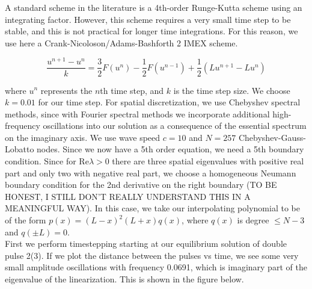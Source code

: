 \documentclass[12pt]{article}
\begin{document}
A standard scheme in the literature is a 4th-order Runge-Kutta scheme using an integrating factor. However, this scheme requires a very small time step to be stable, and this is not practical for longer time integrations. For this reason, we use here a  Crank-Nicoloson/Adams-Bashforth 2 IMEX scheme.

\begin{equation}\label{scheme}
\frac{u^{n+1} - u^n}{k} = \frac{3}{2}F(u^n) - \frac{1}{2}F(u^{n-1}) + \frac{1}{2}\left(Lu^{n+1} - Lu^n \right) 
\end{equation}

where $u^n$ represents the $n$th time step, and $k$ is the time step size. We choose $k = 0.01$ for our time step. For spatial discretization, we use Chebyshev spectral methods, since with Fourier spectral methods we incorporate additional high-frequency oscillations into our solution as a consequence of the essential spectrum on the imaginary axis. We use wave speed $c = 10$ and $N = 257$ Chebyshev-Gauss-Lobatto nodes. Since we now have a 5th order equation, we need a 5th boundary condition. Since for $\textrm{Re} \lambda > 0$ there are three spatial eigenvalues with positive real part and only two with negative real part, we choose a homogeneous Neumann boundary condition for the 2nd derivative on the right boundary (TO BE HONEST, I STILL DON'T REALLY UNDERSTAND THIS IN A MEANINGFUL WAY). In this case, we take our interpolating polynomial to be of the form $p(x) = (L-x)^2 (L+x) q(x)$, where $q(x)$ is degree $\leq N-3$ and $q(\pm L) = 0$. \\

First we perform timestepping starting at our equilibrium solution of double pulse 2(3). If we plot the distance between the pulses vs time, we see some very small amplitude oscillations with frequency 0.0691, which is imaginary part of the eigenvalue of the linearization. This is shown in the figure below.
\end{document}
